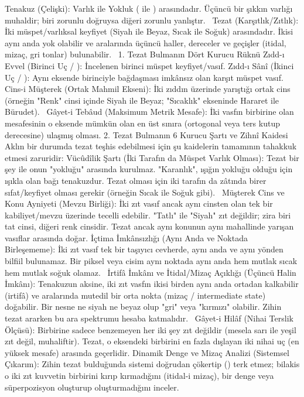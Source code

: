 \documentclass[11pt,a4paper]{article}
\begin{document}
Tenakuz (Çelişki): Varlık ile Yokluk ( ile ) arasındadır. Üçüncü bir şıkkın varlığı muhaldir; biri zorunlu doğruysa diğeri zorunlu yanlıştır.  
 Tezat (Karşıtlık/Zıtlık): İki müspet/varlıksal keyfiyet (Siyah ile Beyaz, Sıcak ile Soğuk) arasındadır. İkisi aynı anda yok olabilir ve aralarında üçüncü haller, dereceler ve geçişler (itidal, mizaç, gri tonlar) bulunabilir.  
1. Tezat Bulmanın Dört Kurucu Rüknü
 Zıdd-ı Evvel (Birinci Uç / ): İncelenen birinci müspet keyfiyet/vasıf.
 Zıdd-ı Sânî (İkinci Uç / ): Aynı eksende birinciyle bağdaşması imkânsız olan karşıt müspet vasıf.
 Cins-i Müşterek (Ortak Mahmil Ekseni): İki zıddın üzerinde yarıştığı ortak cins (örneğin "Renk" cinsi içinde Siyah ile Beyaz; "Sıcaklık" ekseninde Hararet ile Bürudet).  
 Gâyet-i Tebâud (Maksimum Metrik Mesafe): İki vasfın birbirine olan mesafesinin o eksende mümkün olan en üst sınıra (ortogonal veya ters kutup derecesine) ulaşmış olması.
2. Tezat Bulmanın 6 Kurucu Şartı ve Zihnî Kaidesi
Aklın bir durumda tezat teşhis edebilmesi için şu kaidelerin tamamının tahakkuk etmesi zaruridir:
 Vücûdîlik Şartı (İki Tarafın da Müspet Varlık Olması):
Tezat bir şey ile onun "yokluğu" arasında kurulmaz. "Karanlık", ışığın yokluğu olduğu için ışıkla olan bağı tenakuzdur. Tezat olması için iki tarafın da zâtında birer sıfat/keyfiyet olması gerekir (örneğin Sıcak ile Soğuk gibi).  
 Müşterek Cins ve Konu Ayniyeti (Mevzu Birliği):
İki zıt vasıf ancak aynı cinsten olan tek bir kabiliyet/mevzu üzerinde tecelli edebilir. "Tatlı" ile "Siyah" zıt değildir; zira biri tat cinsi, diğeri renk cinsidir. Tezat ancak aynı konunun aynı mahallinde yarışan vasıflar arasında doğar.
 İçtima İmkânsızlığı (Aynı Anda ve Noktada Birleşememe):
İki zıt vasıf tek bir taşıyıcı cevherde, aynı anda ve aynı yönden bilfiil bulunamaz. Bir piksel veya cisim aynı noktada aynı anda hem mutlak sıcak hem mutlak soğuk olamaz.  
 İrtifâ İmkânı ve İtidal/Mizaç Açıklığı (Üçüncü Halin İmkânı):
Tenakuzun aksine, iki zıt vasfın ikisi birden aynı anda ortadan kalkabilir (irtifâ) ve aralarında mutedil bir orta nokta (mizaç / intermediate state) doğabilir. Bir nesne ne siyah ne beyaz olup "gri" veya "kırmızı" olabilir. Zihin tezat ararken bu ara spektrumu hesaba katmalıdır.  
 Gâyet-i Hilâf (Nihai Terslik Ölçüsü):
Birbirine sadece benzemeyen her iki şey zıt değildir (mesela sarı ile yeşil zıt değil, muhaliftir). Tezat, o eksendeki birbirini en fazla dışlayan iki nihai uç (en yüksek mesafe) arasında geçerlidir.
 Dinamik Denge ve Mizaç Analizi (Sistemsel Çıkarım):
Zihin tezat bulduğunda sistemi doğrudan çökertip () terk etmez; bilakis o iki zıt kuvvetin birbirini kırıp kırmadığını (itidal-i mizaç), bir denge veya süperpozisyon oluşturup oluşturmadığını inceler. 
\end{document}
